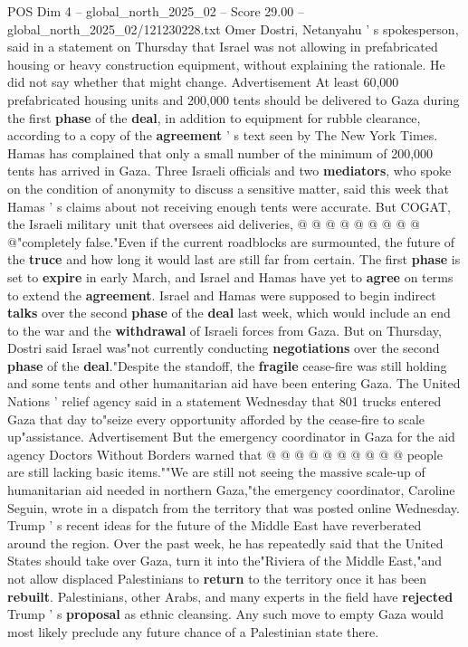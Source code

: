 \begin{textsample}{POS Dim 4 – global\_north\_2025\_02 – Score 29.00 – global\_north\_2025\_02/121230228.txt}
Omer Dostri, Netanyahu ' s spokesperson, said in a statement on Thursday that Israel was not allowing in prefabricated housing or heavy construction equipment, without explaining the rationale.
He did not say whether that might change.
Advertisement At least 60,000 prefabricated housing units and 200,000 tents should be delivered to Gaza during the first \textbf{phase} of the \textbf{deal}, in addition to equipment for rubble clearance, according to a copy of the \textbf{agreement} ' s text seen by The New York Times.
Hamas has complained that only a small number of the minimum of 200,000 tents has arrived in Gaza.
Three Israeli officials and two \textbf{mediators}, who spoke on the condition of anonymity to discuss a sensitive matter, said this week that Hamas ' s claims about not receiving enough tents were accurate.
But COGAT, the Israeli military unit that oversees aid deliveries, @ @ @ @ @ @ @ @ @ @"completely false."Even if the current roadblocks are surmounted, the future of the \textbf{truce} and how long it would last are still far from certain.
The first \textbf{phase} is set to \textbf{expire} in early March, and Israel and Hamas have yet to \textbf{agree} on terms to extend the \textbf{agreement}.
Israel and Hamas were supposed to begin indirect \textbf{talks} over the second \textbf{phase} of the \textbf{deal} last week, which would include an end to the war and the \textbf{withdrawal} of Israeli forces from Gaza.
But on Thursday, Dostri said Israel was"not currently conducting \textbf{negotiations} over the second \textbf{phase} of the \textbf{deal}."Despite the standoff, the \textbf{fragile} cease-fire was still holding and some tents and other humanitarian aid have been entering Gaza.
The United Nations ' relief agency said in a statement Wednesday that 801 trucks entered Gaza that day to"seize every opportunity afforded by the cease-fire to scale up"assistance.
Advertisement But the emergency coordinator in Gaza for the aid agency Doctors Without Borders warned that @ @ @ @ @ @ @ @ @ @ people are still lacking basic items.""We are still not seeing the massive scale-up of humanitarian aid needed in northern Gaza,"the emergency coordinator, Caroline Seguin, wrote in a dispatch from the territory that was posted online Wednesday.
Trump ' s recent ideas for the future of the Middle East have reverberated around the region.
Over the past week, he has repeatedly said that the United States should take over Gaza, turn it into the"Riviera of the Middle East,"and not allow displaced Palestinians to \textbf{return} to the territory once it has been \textbf{rebuilt}.
Palestinians, other Arabs, and many experts in the field have \textbf{rejected} Trump ' s \textbf{proposal} as ethnic cleansing.
Any such move to empty Gaza would most likely preclude any future chance of a Palestinian state there.

\end{textsample}
